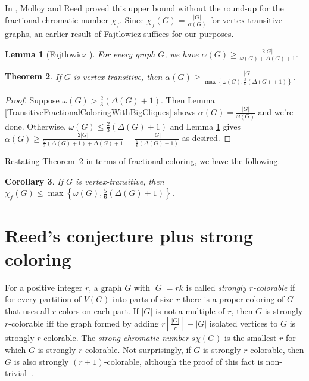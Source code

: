 \documentclass[12pt]{article}
\theoremstyle{plain}
\newtheorem{thm}{Theorem}[section]
\newtheorem{lem}[thm]{Lemma}
\newtheorem{cor}[thm]{Corollary}
\theoremstyle{definition}
\theoremstyle{remark}
\newcommand{\set}[1]{\left\{ #1 \right\}}
\newcommand{\card}[1]{\left|#1\right|}
\newcommand{\ceil}[1]{\left\lceil#1\right\rceil}
\newcommand{\parens}[1]{\left( #1 \right)}
\begin{document}
In \cite{molloy2002graph}, Molloy and Reed proved this upper bound without the
round-up for the fractional chromatic number $\chi_f$.  
Since $\chi_f(G) = \frac{|G|}{\alpha(G)}$ for vertex-transitive graphs, an
earlier result of Fajtlowicz \cite{fajtlowicz1984independence} suffices for our
purposes.

\begin{lem}[Fajtlowicz \cite{fajtlowicz1984independence}]\label{fajtlowicz}
For every graph $G$, we have $\alpha(G) \ge \frac{2|G|}{\omega(G) + \Delta(G) + 1}$.
\end{lem}

\begin{thm}
If $G$ is vertex-transitive, then $\alpha(G) \ge \frac{|G|}{\max\set{\omega(G), \frac56\parens{\Delta(G) + 1}}}$.
\label{fracversion}
\end{thm}
\begin{proof}
Suppose $\omega(G) > \frac23 \parens{\Delta(G) + 1}$.  Then Lemma \ref{TransitiveFractionalColoringWithBigCliques} shows $\alpha(G) = \frac{|G|}{\omega(G)}$ and we're done.  Otherwise, $\omega(G) \le \frac23 \parens{\Delta(G) + 1}$ and Lemma \ref{fajtlowicz} gives $\alpha(G) \ge \frac{2|G|}{\frac23 (\Delta(G) + 1) + \Delta(G) + 1} = \frac{|G|}{\frac56 (\Delta(G) + 1)}$ as desired.
\end{proof}

Restating Theorem~\ref{fracversion} in terms of fractional coloring, we have
the following.

\begin{cor}
If $G$ is vertex-transitive, then $\chi_f(G) \le \max\set{\omega(G), \frac56\parens{\Delta(G) + 1}}$.
\end{cor}

\section{Reed's conjecture plus strong coloring}
For a positive integer $r$, a graph $G$ with $\card{G} = rk$ is called
\emph{strongly $r$-colorable} if for every partition of $V(G)$ into parts of
size $r$ there is a proper coloring of $G$ that uses all $r$ colors on each
part.  If $\card{G}$ is not a multiple of $r$, then $G$ is strongly
$r$-colorable iff the graph formed by adding $r\ceil{\frac{|G|}{r}} - |G|$
isolated vertices to $G$ is strongly $r$-colorable.  The \emph{strong chromatic
number} $s\chi(G)$ is the smallest $r$ for which $G$ is strongly $r$-colorable.
Not surprisingly, if $G$ is strongly $r$-colorable, then $G$ is also strongly
$(r+1)$-colorable, although the proof of this fact is
non-trivial~\cite{Fellows1990}.
\end{document}
